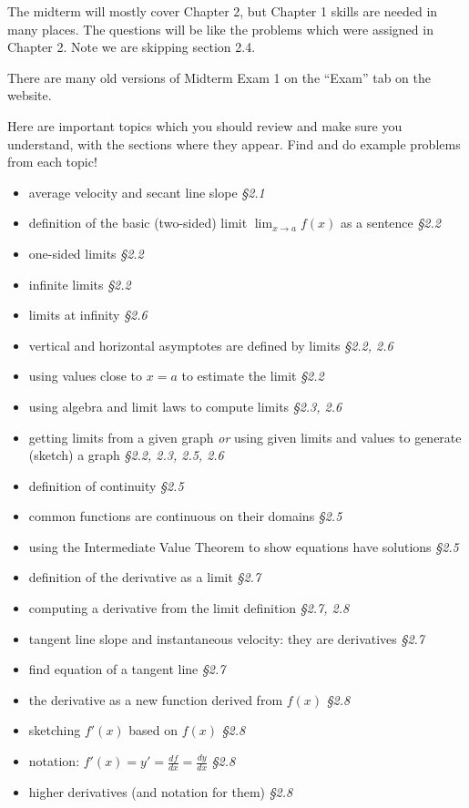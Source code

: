 \documentclass[12pt]{article}
\begin{document}
\renewcommand{\d}{\displaystyle}

The midterm will mostly cover Chapter 2, but Chapter 1 skills are needed in many places.  The questions will be like the problems which were assigned in Chapter 2.  Note we are skipping section 2.4.

There are many old versions of Midterm Exam 1 on the ``Exam'' tab on the website.

Here are important topics which you should review and make sure you understand, with the sections where they appear.  Find and do example problems from each topic!
\begin{itemize}
\item average velocity and secant line slope \hfill \emph{\S 2.1}
\item definition of the basic (two-sided) limit $\lim_{x\to a} f(x)$ as a sentence \hfill\emph{\S 2.2}
\item one-sided limits  \hfill \emph{\S 2.2}
\item infinite limits  \hfill \emph{\S 2.2}
\item limits at infinity  \hfill \emph{\S 2.6}
\item vertical and horizontal asymptotes are defined by limits  \hfill \emph{\S 2.2, 2.6}
\item using values close to $x=a$ to estimate the limit  \hfill \emph{\S 2.2}
\item using algebra and limit laws to compute limits  \hfill \emph{\S 2.3, 2.6}
\item getting limits from a given graph \emph{or} using given limits and values to generate (sketch) a graph  \hfill \emph{\S 2.2, 2.3, 2.5, 2.6}
\item definition of continuity  \hfill \emph{\S 2.5}
\item common functions are continuous on their domains  \hfill \emph{\S 2.5}
\item using the Intermediate Value Theorem to show equations have solutions \hfill \emph{\S 2.5}
\item definition of the derivative as a limit  \hfill \emph{\S 2.7}
\item computing a derivative from the limit definition  \hfill \emph{\S 2.7, 2.8}
\item tangent line slope and instantaneous velocity: they are derivatives  \hfill \emph{\S 2.7}
\item find equation of a tangent line  \hfill \emph{\S 2.7}
\item the derivative as a new function derived from $f(x)$  \hfill \emph{\S 2.8}
\item sketching $f'(x)$ based on $f(x)$  \hfill \emph{\S 2.8}
\item notation: $f'(x)=y'=\frac{df}{dx}=\frac{dy}{dx}$  \hfill \emph{\S 2.8}
\item higher derivatives (and notation for them)  \hfill \emph{\S 2.8}
\end{itemize}
\end{document}
